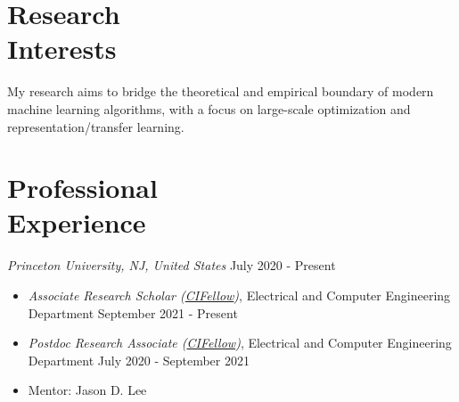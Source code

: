 \documentclass[margin, 10pt]{res} %
\begin{document}
\begin{resume}
\section{Research\\ Interests}
My research aims to bridge the theoretical and empirical boundary of modern machine learning algorithms, with a focus on large-scale optimization and representation/transfer learning. 
\begin{comment} 
\textbf{Large-scale optimization:}
\begin{itemize}
	\item Efficient and scalable optimization algorithm design: exploiting problem's underlying structure
	\item Two-player games: customized adversarial robustness and generative adversarial network training 
	\item Distributed systems: gradient coding and asynchronous distributed learning 
\end{itemize}
\textbf{Representation Learning and Transfer Learning}
\begin{itemize}
\item Statistical learning theory of representation with supervised pretraining, fine-tuning and self-supervised learning
\item Application to meta-reinforcement learning 
\end{itemize}
Applications:
\begin{itemize}
	\item Inverse problems with generative models
\end{itemize}
\end{comment} 

\section{Professional\\Experience}
{\sl Princeton University, NJ, United States} \hfill July 2020 - Present
\begin{itemize}
	\item {\sl Associate Research Scholar (\href{https://cifellows2020.org/}{CIFellow})}, Electrical and Computer Engineering Department \hfill September 2021 - Present 
	\item {\sl Postdoc Research Associate (\href{https://cifellows2020.org/}{CIFellow})}, Electrical and Computer Engineering Department \hfill July 2020 - September 2021 
	\item Mentor: Jason D. Lee
\end{itemize}



\end{resume}
\end{document}
